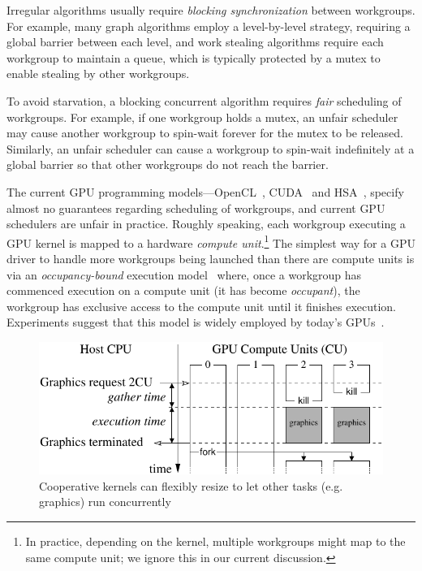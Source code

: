 \documentclass[sigconf]{acmart}
\begin{document}
Irregular algorithms usually require \emph{blocking synchronization}
between workgroups.  For example, many graph algorithms employ a level-by-level
strategy, requiring a global barrier between each level, and work
stealing algorithms require each workgroup to maintain a queue, which
is typically protected by a mutex to enable stealing by other
workgroups.

To avoid starvation, a blocking concurrent algorithm requires
\emph{fair} scheduling of workgroups.  For
example, if one workgroup holds a mutex, an unfair scheduler may cause
another workgroup to spin-wait forever for the mutex to be
released.  Similarly, an unfair scheduler can cause a workgroup to spin-wait
indefinitely at a global barrier so that other workgroups do not reach the barrier.

 The current GPU programming
models---OpenCL~\cite{opencl2Spec}, CUDA~\cite{cuda-75} and
HSA~\cite{HSAprogramming11}, specify almost no guarantees regarding
scheduling of workgroups, and current GPU schedulers are unfair in
practice.  Roughly speaking, each workgroup executing a GPU kernel is
mapped to a hardware \emph{compute unit}.\footnote{In practice,
  depending on the kernel, multiple workgroups might map to the same
  compute unit; we ignore this in our current discussion.}
%
The simplest way for a GPU driver to handle more workgroups being
launched than there are compute units is via an \emph{occupancy-bound}
execution
model~\cite{owens-persistent,DBLP:conf/oopsla/SorensenDBGR16} where,
once a workgroup has commenced execution on a compute unit (it has
become \emph{occupant}), the workgroup has exclusive access to the
compute unit until it finishes execution.
Experiments suggest that this model
is widely employed by today's
GPUs~\cite{owens-persistent,DBLP:conf/oopsla/SorensenDBGR16,DBLP:conf/oopsla/PaiP16,BNP12}.


\begin{figure}[t]
\centering
\includegraphics[width=\columnwidth]{overview.pdf}
\caption{Cooperative kernels can flexibly resize to let other tasks
(e.g. graphics) run concurrently}
\label{fig:overview}
\end{figure}
\end{document}
